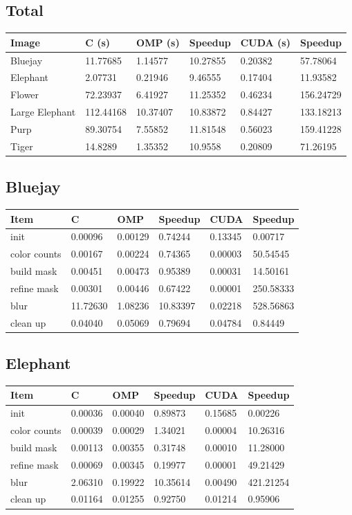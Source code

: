 \documentclass[12pt]{article}
\begin{document}
\subsection{Total}
\begin{tabular}{l|l|l|l|l|l}
    Image & C (s) & OMP (s) & Speedup & CUDA (s) & Speedup
\\  \hline
    Bluejay & 11.77685 & 1.14577 & 10.27855 & 0.20382 & 57.78064
\\  Elephant & 2.07731 & 0.21946 & 9.46555 & 0.17404 & 11.93582
\\  Flower & 72.23937 & 6.41927 & 11.25352 & 0.46234 & 156.24729
\\  Large Elephant & 112.44168 & 10.37407 & 10.83872 & 0.84427 & 133.18213
\\  Purp & 89.30754 & 7.55852 & 11.81548 & 0.56023 & 159.41228
\\  Tiger & 14.8289 & 1.35352 & 10.9558 & 0.20809 & 71.26195
\end{tabular}

\subsection{Bluejay}
\begin{tabular}{l|l|l|l|l|l}
    Item & C & OMP & Speedup & CUDA & Speedup
\\  \hline
    init & 0.00096 & 0.00129 & 0.74244 & 0.13345 & 0.00717
\\  color counts & 0.00167 & 0.00224 & 0.74365 & 0.00003 & 50.54545
\\  build mask & 0.00451 & 0.00473 & 0.95389 & 0.00031 & 14.50161
\\  refine mask & 0.00301 & 0.00446 & 0.67422 & 0.00001 & 250.58333
\\  blur & 11.72630 & 1.08236 & 10.83397 & 0.02218 & 528.56863
\\  clean up & 0.04040 & 0.05069 & 0.79694 & 0.04784 & 0.84449
\end{tabular}
\subsection{Elephant}
\begin{tabular}{l|l|l|l|l|l}
    Item & C & OMP & Speedup & CUDA & Speedup
\\  \hline
    init & 0.00036 & 0.00040 & 0.89873 & 0.15685 & 0.00226
\\  color counts & 0.00039 & 0.00029 & 1.34021 & 0.00004 & 10.26316
\\  build mask & 0.00113 & 0.00355 & 0.31748 & 0.00010 & 11.28000
\\  refine mask & 0.00069 & 0.00345 & 0.19977 & 0.00001 & 49.21429
\\  blur & 2.06310 & 0.19922 & 10.35614 & 0.00490 & 421.21254
\\  clean up & 0.01164 & 0.01255 & 0.92750 & 0.01214 & 0.95906
\end{tabular}
\end{document}

